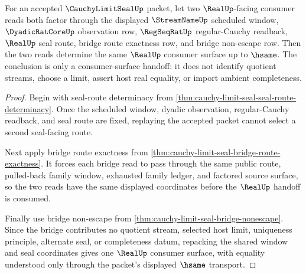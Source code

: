 \begin{theorem}
\label{thm:cauchy-limit-seal-realup-uniqueness-handoff}
For an accepted $\CauchyLimitSealUp$ packet, let two $\RealUp$-facing consumer reads both factor through the displayed $\StreamNameUp$ scheduled window, $\DyadicRatCoreUp$ observation row, $\RegSeqRatUp$ regular-Cauchy readback, $\RealUp$ seal route, bridge route exactness row, and bridge non-escape row. Then the two reads determine the same $\RealUp$ consumer surface up to $\hsame$. The conclusion is only a consumer-surface handoff: it does not identify quotient streams, choose a limit, assert host real equality, or import ambient completeness.
\end{theorem}
\begin{proof}
Begin with seal-route determinacy from \autoref{thm:cauchy-limit-seal-seal-route-determinacy}. Once the scheduled window, dyadic observation, regular-Cauchy readback, and seal route are fixed, replaying the accepted packet cannot select a second seal-facing route.

Next apply bridge route exactness from \autoref{thm:cauchy-limit-seal-bridge-route-exactness}. It forces each bridge read to pass through the same public route, pulled-back family window, exhausted family ledger, and factored source surface, so the two reads have the same displayed coordinates before the $\RealUp$ handoff is consumed.

Finally use bridge non-escape from \autoref{thm:cauchy-limit-seal-bridge-nonescape}. Since the bridge contributes no quotient stream, selected host limit, uniqueness principle, alternate seal, or completeness datum, repacking the shared window and seal coordinates gives one $\RealUp$ consumer surface, with equality understood only through the packet's displayed $\hsame$ transport.
\end{proof}

